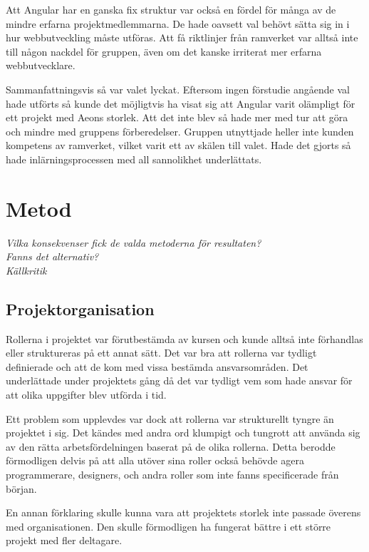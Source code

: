 Att Angular har en ganska fix struktur var också en fördel för många av de mindre erfarna projektmedlemmarna. De hade oavsett val behövt sätta sig in i hur webbutveckling måste utföras. Att få riktlinjer från ramverket var alltså inte till någon nackdel för gruppen, även om det kanske irriterat mer erfarna webbutvecklare.

Sammanfattningsvis så var valet lyckat. Eftersom ingen förstudie angående val hade utförts så kunde det möjligtvis ha visat sig att Angular varit olämpligt för ett projekt med Aeons storlek. Att det inte blev så hade mer med tur att göra och mindre med gruppens förberedelser. Gruppen utnyttjade heller inte kunden kompetens av ramverket, vilket varit ett av skälen till valet. Hade det gjorts så hade inlärningsprocessen med all sannolikhet underlättats.  





\section{Metod}
\emph{Vilka konsekvenser fick de valda metoderna för resultaten?} \\
\emph{Fanns det alternativ?}\\
\emph{Källkritik}\\

\subsection{Projektorganisation}
Rollerna i projektet var förutbestämda av kursen och kunde alltså inte förhandlas eller struktureras på ett annat sätt. Det var bra att rollerna var tydligt definierade och att de kom med vissa bestämda ansvarsområden. Det underlättade under projektets gång då det var tydligt vem som hade ansvar för att olika uppgifter blev utförda i tid.

Ett problem som upplevdes var dock att rollerna var strukturellt tyngre än projektet i sig. Det kändes med andra ord klumpigt och tungrott att använda sig av den rätta arbetsfördelningen baserat på de olika rollerna. Detta berodde förmodligen delvis på att alla utöver sina roller också behövde agera programmerare, designers, och andra roller som inte fanns specificerade från början. 

En annan förklaring skulle kunna vara att projektets storlek inte passade överens med organisationen. Den skulle förmodligen ha fungerat bättre i ett större projekt med fler deltagare.

